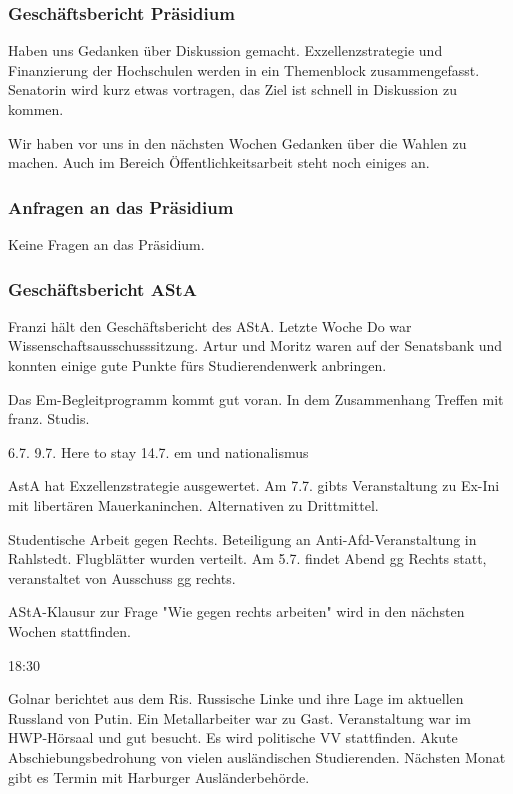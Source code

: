 \documentclass[ngerman,headheight=70pt]{scrartcl}
\begin{document}
    \subsubsection{Geschäftsbericht Präsidium}

    Haben uns Gedanken über Diskussion gemacht. Exzellenzstrategie und
    Finanzierung der Hochschulen werden in ein Themenblock zusammengefasst.
    Senatorin wird kurz etwas vortragen, das Ziel ist schnell in Diskussion zu
    kommen.

    Wir haben vor uns in den nächsten Wochen Gedanken über die Wahlen
    zu machen. Auch im Bereich Öffentlichkeitsarbeit steht noch einiges an.

    \subsubsection{Anfragen an das Präsidium}

    Keine Fragen an das Präsidium.

    \subsubsection{Geschäftsbericht AStA}

    Franzi hält den Geschäftsbericht des AStA. Letzte Woche Do war
    Wissenschaftsausschusssitzung. Artur und Moritz waren auf der Senatsbank
    und konnten einige gute Punkte fürs Studierendenwerk anbringen.

    Das Em-Begleitprogramm kommt gut voran. In dem Zusammenhang Treffen mit
    franz. Studis.

    6.7.
    9.7. Here to stay
    14.7. em und nationalismus

    AstA hat Exzellenzstrategie ausgewertet.
    Am 7.7. gibts Veranstaltung zu Ex-Ini mit libertären Mauerkaninchen.
    Alternativen zu Drittmittel.

    Studentische Arbeit gegen Rechts. Beteiligung an Anti-Afd-Veranstaltung
    in Rahlstedt. Flugblätter wurden verteilt.
    Am 5.7. findet Abend gg Rechts statt, veranstaltet von Ausschuss gg rechts.

    AStA-Klausur zur Frage "Wie gegen rechts arbeiten" wird in den nächsten
    Wochen stattfinden.

    18:30

    Golnar berichtet aus dem Ris. Russische Linke und ihre Lage im aktuellen
    Russland von Putin. Ein Metallarbeiter war zu Gast. Veranstaltung war
    im HWP-Hörsaal und gut besucht. Es wird politische VV stattfinden. Akute
    Abschiebungsbedrohung von vielen ausländischen Studierenden.
    Nächsten Monat gibt es Termin mit Harburger Ausländerbehörde.
\end{document}
